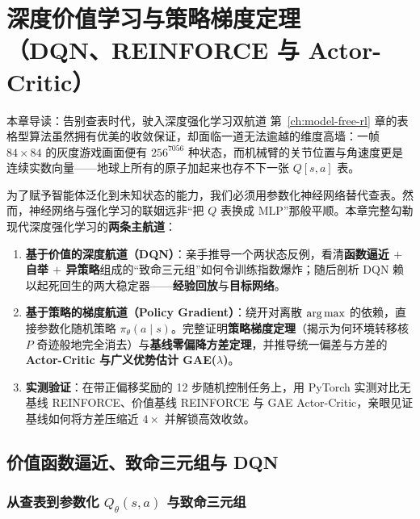 \chapter[深度价值、策略梯度与 Actor-Critic]{深度价值学习与策略梯度定理\\（DQN、REINFORCE 与 Actor-Critic）}
\label{ch:dqn-pg-ac}


\begin{chapIntro}{本章导读：告别查表时代，驶入深度强化学习双航道}
第~\ref{ch:model-free-rl} 章的表格型算法虽然拥有优美的收敛保证，却面临一道无法逾越的维度高墙：一帧 $84 \times 84$ 的灰度游戏画面便有 $256^{7056}$ 种状态，而机械臂的关节位置与角速度更是连续实数向量——地球上所有的原子加起来也存不下一张 $Q[s, a]$ 表。

为了赋予智能体泛化到未知状态的能力，我们必须用参数化神经网络替代查表。然而，神经网络与强化学习的联姻远非“把 $Q$ 表换成 MLP”那般平顺。本章完整勾勒现代深度强化学习的\textbf{两条主航道}：
\begin{enumerate}
  \item \textbf{基于价值的深度航道（DQN）}：亲手推导一个两状态反例，看清\textbf{函数逼近 $+$ 自举 $+$ 异策略}组成的“致命三元组”如何令训练指数爆炸；随后剖析 DQN 赖以起死回生的两大稳定器——\textbf{经验回放}与\textbf{目标网络}。
  \item \textbf{基于策略的梯度航道（Policy Gradient）}：绕开对离散 $\operatorname*{arg\,max}$ 的依赖，直接参数化随机策略 $\pi_\theta(a\mid s)$。完整证明\textbf{策略梯度定理}（揭示为何环境转移核 $P$ 奇迹般地完全消去）与\textbf{基线零偏降方差定理}，并推导统一偏差与方差的 \textbf{Actor-Critic 与广义优势估计 GAE($\lambda$)}。
  \item \textbf{实测验证}：在带正偏移奖励的 12 步随机控制任务上，用 PyTorch 实测对比无基线 REINFORCE、价值基线 REINFORCE 与 GAE Actor-Critic，亲眼见证基线如何将方差压缩近 $4\times$ 并解锁高效收敛。
\end{enumerate}
\end{chapIntro}

\section{价值函数逼近、致命三元组与 DQN}
\label{sec:dqn-triad}

\subsection{从查表到参数化 $Q_\theta(s, a)$ 与致命三元组}

